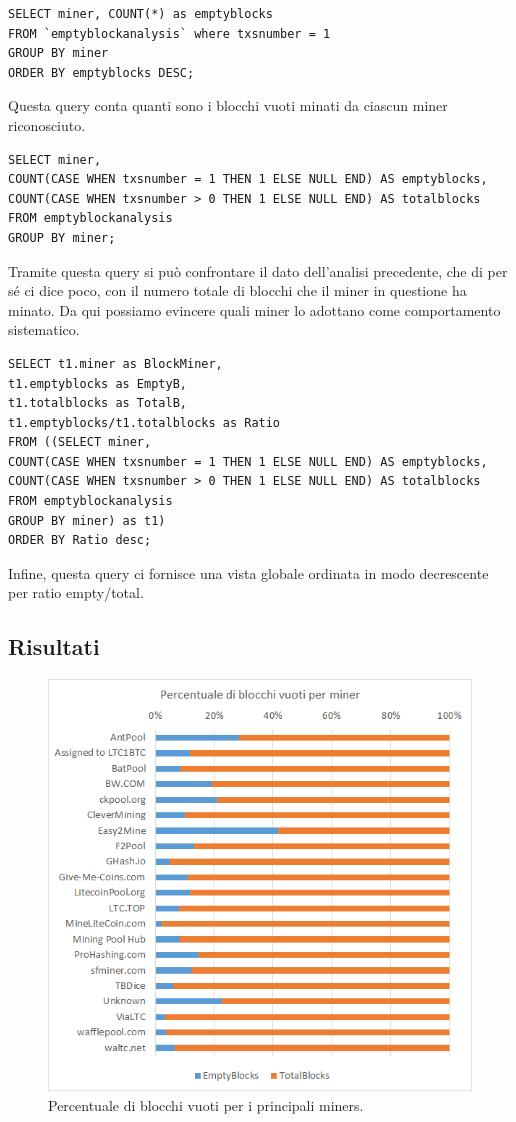 \begin{lstlisting}
SELECT miner, COUNT(*) as emptyblocks 
FROM `emptyblockanalysis` where txsnumber = 1
GROUP BY miner
ORDER BY emptyblocks DESC;
\end{lstlisting}


Questa query conta quanti sono i blocchi vuoti minati da ciascun miner riconosciuto.

\begin{lstlisting}
SELECT miner,
COUNT(CASE WHEN txsnumber = 1 THEN 1 ELSE NULL END) AS emptyblocks,
COUNT(CASE WHEN txsnumber > 0 THEN 1 ELSE NULL END) AS totalblocks
FROM emptyblockanalysis
GROUP BY miner;
\end{lstlisting}

Tramite questa query si può confrontare il dato dell’analisi precedente, che di per sé ci dice poco, con il numero totale di blocchi che il miner in questione ha minato. Da qui possiamo evincere quali miner lo adottano come comportamento sistematico.

\begin{lstlisting}
SELECT t1.miner as BlockMiner,
t1.emptyblocks as EmptyB,
t1.totalblocks as TotalB,
t1.emptyblocks/t1.totalblocks as Ratio 
FROM ((SELECT miner,
COUNT(CASE WHEN txsnumber = 1 THEN 1 ELSE NULL END) AS emptyblocks,
COUNT(CASE WHEN txsnumber > 0 THEN 1 ELSE NULL END) AS totalblocks
FROM emptyblockanalysis
GROUP BY miner) as t1)
ORDER BY Ratio desc;
\end{lstlisting}		

Infine, questa query ci fornisce una vista globale ordinata in modo decrescente per ratio empty/total.				
\subsection{Risultati}

\begin{figure}[h!]
	\centering
	\includegraphics[width=0.8\linewidth]{images/percentuale-blocchi-vuoti-per-miner}
	\caption{Percentuale di blocchi vuoti per i principali miners.}
	\label{fig:percentuale-blocchi-vuoti-per-miner}
\end{figure}



